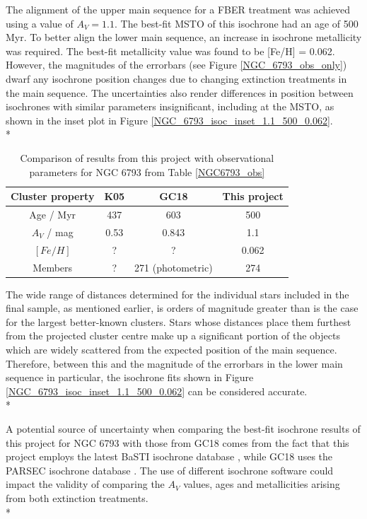 \documentclass[12pt, a4paper]{report}
\begin{document}
The alignment of the upper main sequence for a FBER treatment was achieved using a value of $A_{V} = 1.1$. The best-fit MSTO of this isochrone had an age of 500 Myr. To better align the lower main sequence, an increase in isochrone metallicity was required. The best-fit metallicity value was found to be [Fe/H] = 0.062.  However, the magnitudes of the errorbars (see Figure \ref{NGC_6793_obs_only}) dwarf any isochrone position changes due to changing extinction treatments in the main sequence. The uncertainties also render differences in position between isochrones with similar parameters insignificant, including at the MSTO, as shown in the inset plot in Figure \ref{NGC_6793_isoc_inset_1.1_500_0.062}.\\*


\begin{table}
\begin{center}
\begin{tabular}{cccc}
\hline
Cluster property & K05 & GC18 & This project \\
\hline
Age / Myr & 437 & 603 & 500 \\
$A_{V}$ / mag & 0.53 & 0.843 & 1.1 \\
$[Fe/H]$ & ? & ? & 0.062 \\
Members & ? & 271 (photometric) & 274 \\
\hline
\end{tabular}
\caption{Comparison of results from this project with observational parameters for NGC 6793 from Table \ref{NGC6793_obs}}
\label{NGC6793_result}
\end{center}
\end{table}

The wide range of distances determined for the individual stars included in the final sample, as mentioned earlier, is orders of magnitude greater than is the case for the largest better-known clusters. Stars whose distances place them furthest from the projected cluster centre make up a significant portion of the objects which are widely scattered from the expected position of the main sequence. Therefore, between this and the magnitude of the errorbars in the lower main sequence in particular, the isochrone fits shown in Figure \ref{NGC_6793_isoc_inset_1.1_500_0.062} can be considered accurate. \\*

A potential source of uncertainty when comparing the best-fit isochrone results of this project for NGC 6793 with those from GC18 comes from the fact that this project employs the latest BaSTI isochrone database \citep{2018ApJ...856..125H}, while GC18 uses the PARSEC isochrone database \citep{2017ApJ...835...77M}. The use of different isochrone software could impact the validity of comparing the $A_{V}$ values, ages and metallicities arising from both extinction treatments.\\*
\end{document}
